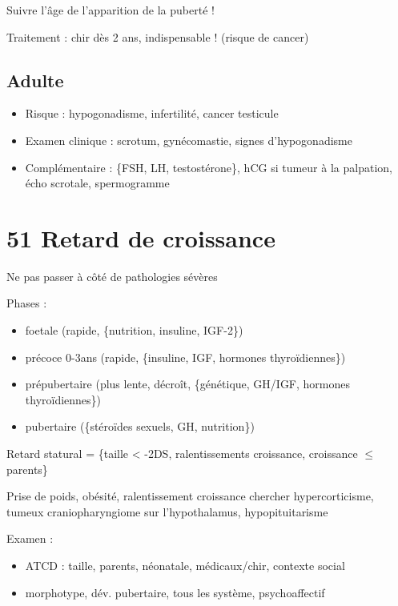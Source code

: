 \documentclass{book}
\begin{document}
Suivre l'âge de l'apparition de la puberté !

Traitement : chir dès 2 ans, indispensable ! (risque de cancer)
\subsection{Adulte}
\label{sec:org701bb4f}
\begin{itemize}
\item Risque : hypogonadisme, infertilité, cancer testicule
\item Examen clinique : scrotum, gynécomastie, signes d'hypogonadisme
\item Complémentaire : \{FSH, LH, testostérone\}, hCG si tumeur à la palpation, écho
scrotale, spermogramme
\end{itemize}
\section{51 \textdagger{} Retard de croissance}
\label{sec:org53cd188}
\danger Ne pas passer à côté de pathologies sévères

Phases : 
\begin{itemize}
\item foetale (rapide, \{nutrition, insuline, IGF-2\})
\item précoce 0-3ans (rapide, \{insuline, IGF, hormones thyroïdiennes\})
\item prépubertaire (plus lente, décroît, \{génétique, GH/IGF, hormones thyroïdiennes\})
\item pubertaire (\{stéroïdes sexuels, GH, nutrition\})
\end{itemize}

Retard statural = \{taille < -2DS, ralentissements croissance, croissance \(\le\) parents\}

Prise de poids, obésité, ralentissement croissance \thus chercher
hypercorticisme, tumeux craniopharyngiome sur l'hypothalamus, hypopituitarisme

Examen :
\begin{itemize}
\item ATCD : taille, parents, néonatale, médicaux/chir, contexte social
\item morphotype, dév. pubertaire, tous les système, psychoaffectif
\end{itemize}
\end{document}
